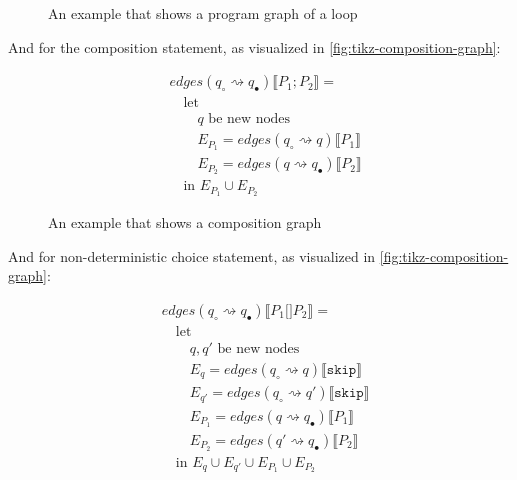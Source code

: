 \begin{figure}[htb!]
    \center
    
    \caption{An example that shows a program graph of a loop}
    \label{fig:tikz-program-graph-loop}
\end{figure}

And for the composition statement, as visualized in \autoref{fig:tikz-composition-graph}:

\begin{equation}
    \begin{split}
        &edges(q_\circ \rightsquigarrow q_\bullet) \llbracket P_1; P_2 \rrbracket = \\
        &\quad \text{let } \\
        &\quad\quad q \text{ be new nodes} \\
        &\quad\quad E_{P_1} = edges(q_\circ \rightsquigarrow q) \llbracket P_1 \rrbracket \\
        &\quad\quad E_{P_2} = edges(q \rightsquigarrow q_\bullet) \llbracket P_2 \rrbracket \\
        &\quad \text{in } E_{P_1} \cup E_{P_2}
    \end{split}\label{eq:equation10}
\end{equation}


\begin{figure}
    \center
    
    \caption{An example that shows a composition graph}
    \label{fig:tikz-composition-graph}
\end{figure}


And for non-deterministic choice statement, as visualized in \autoref{fig:tikz-composition-graph}:

\begin{equation}
    \begin{split}
        &edges(q_\circ \rightsquigarrow q_\bullet) \llbracket P_1 \texttt{[]} P_2 \rrbracket = \\
        &\quad \text{let } \\
        &\quad\quad q, q' \text{ be new nodes} \\
        &\quad\quad E_{q} = edges(q_\circ \rightsquigarrow q) \llbracket \texttt{skip} \rrbracket \\
        &\quad\quad E_{q'} = edges(q_\circ \rightsquigarrow q') \llbracket \texttt{skip} \rrbracket \\
        &\quad\quad E_{P_1}= edges(q \rightsquigarrow q_\bullet) \llbracket P_1 \rrbracket \\
        &\quad\quad E_{P_2}= edges(q' \rightsquigarrow q_\bullet) \llbracket P_2 \rrbracket \\
        &\quad \text{in } E_{q} \cup E_{q'} \cup E_{P_1} \cup E_{P_2}
    \end{split}\label{eq:equation8}
\end{equation}

